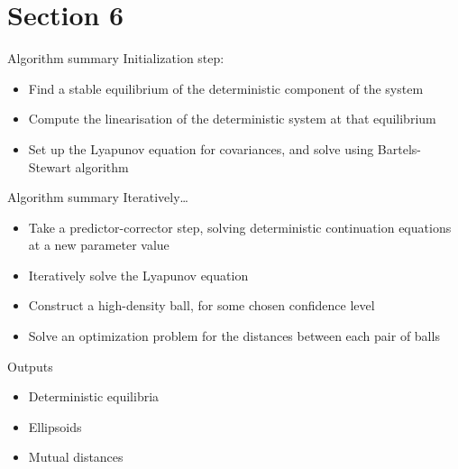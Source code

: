 \documentclass[presentation]{beamer}
\begin{document}
\section{Section 6}
\label{sec:orgdb56172}
\begin{frame}[label={sec:orgf8dbf49}]{Algorithm summary}
Initialization step:
\vfill
\begin{itemize}
\item Find a stable equilibrium of the deterministic component of the system
\end{itemize}
\vfill
\begin{itemize}
\item Compute the linearisation of the deterministic system at that equilibrium
\end{itemize}
\vfill
\begin{itemize}
\item Set up the Lyapunov equation for covariances, and solve using Bartels-Stewart algorithm
\end{itemize}
\end{frame}
\begin{frame}[label={sec:orgcb9f44b}]{Algorithm summary}
Iteratively\ldots{}
\begin{itemize}
\item Take a predictor-corrector step, solving deterministic continuation equations at a new parameter value
\end{itemize}
\vfill
\begin{itemize}
\item Iteratively solve the Lyapunov equation
\end{itemize}
\vfill
\begin{itemize}
\item Construct a high-density ball, for some chosen confidence level
\end{itemize}
\vfill
\begin{itemize}
\item Solve an optimization problem for the distances between each pair of balls
\end{itemize}
\end{frame}

\begin{frame}[label={sec:org14daea8}]{Outputs}
\begin{itemize}
\item Deterministic equilibria
\end{itemize}
\vfill
\begin{itemize}
\item Ellipsoids
\end{itemize}
\vfill
\begin{itemize}
\item Mutual distances
\end{itemize}
\end{frame}
\end{document}
